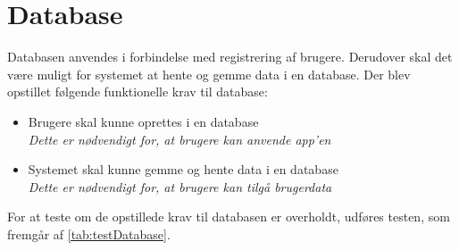\section{Database}
Databasen anvendes i forbindelse med registrering af brugere. Derudover skal det være muligt for systemet at hente og gemme data i en database. Der blev opstillet følgende funktionelle krav til database:
 
\begin{itemize}
\item Brugere skal kunne oprettes i en database
\\
\textit{Dette er nødvendigt for, at brugere kan anvende app’en}
\item Systemet skal kunne gemme og hente data i en database
\\
\textit{Dette er nødvendigt for, at brugere kan tilgå brugerdata}
\end{itemize}

\noindent
For at teste om de opstillede krav til databasen er overholdt, udføres testen, som fremgår af \autoref{tab:testDatabase}.

